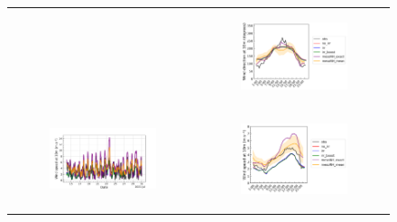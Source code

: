 \begin{figure}[hbtp]
\begin{tabular}{cc}
\begin{subfigure}[t]{0.5\textwidth}
        \end{subfigure} &
        \begin{subfigure}[t]{0.5\textwidth}
            \caption{}
            \includegraphics[width=\textwidth]{images/chap5/SOP_TS_DC/diurnal_cycle_cendrosa_wind_direction_10m.png}
        \end{subfigure} \\
        \begin{subfigure}[t]{0.5\textwidth}
            \caption{}
            \includegraphics[width=\textwidth]{images/chap5/SOP_TS_DC/time_series_elsplans_wind_speed_10m.png}
        \end{subfigure} &
        \begin{subfigure}[t]{0.5\textwidth}
            \caption{}
            \includegraphics[width=\textwidth]{images/chap5/SOP_TS_DC/diurnal_cycle_elsplans_wind_speed_10m.png}

\end{subfigure}
\end{tabular}
\end{figure}

